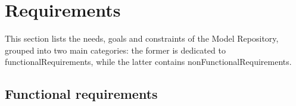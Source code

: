 \section{Requirements}
\label{requirements}
This section lists the needs, goals and constraints of the \ddmore Model Repository, grouped into two main categories: the former is dedicated to \glspl{functionalRequirement}, while the latter contains \glspl{nonFunctionalRequirement}. 

\subsection{Functional requirements}
\label{functionalRequirements}

